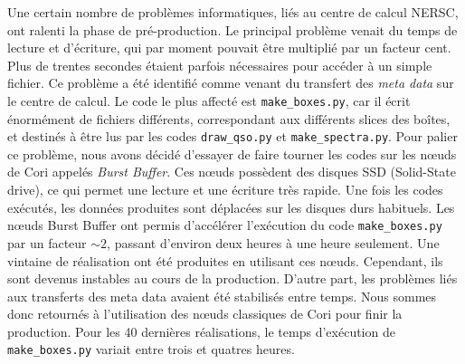 Une certain nombre de problèmes informatiques, liés au centre de calcul NERSC, ont ralenti la phase de pré-production. Le principal problème venait du temps de lecture et d'écriture, qui par moment pouvait être multiplié par un facteur cent. Plus de trentes secondes étaient parfois nécessaires pour accéder à un simple fichier. Ce problème a été identifié comme venant du transfert des \emph{meta data} sur le centre de calcul. Le code le plus affecté est \texttt{make\_boxes.py}, car il écrit énormément de fichiers différents, correspondant aux différents slices des boîtes, et destinés à être lus par les codes \texttt{draw\_qso.py} et \texttt{make\_spectra.py}. Pour palier ce problème, nous avons décidé d'essayer de faire tourner les codes sur les n{\oe}uds de Cori appelés \emph{Burst Buffer}. Ces n{\oe}uds possèdent des disques SSD (Solid-State drive), ce qui permet une lecture et une écriture très rapide. Une fois les codes exécutés, les données produites sont déplacées sur les disques durs habituels. Les n{\oe}uds Burst Buffer ont permis d'accélérer l'exécution du code \texttt{make\_boxes.py} par un facteur $\sim \num{2}$, passant d'environ deux heures à une heure seulement. Une vintaine de réalisation ont été produites en utilisant ces n{\oe}uds. Cependant, ils sont devenus instables au cours de la production. D'autre part, les problèmes liés aux transferts des meta data avaient été stabilisés entre temps. Nous sommes donc retournés à l'utilisation des n{\oe}uds classiques de Cori pour finir la production. Pour les 40 dernières réalisations, le temps d'exécution de \texttt{make\_boxes.py} variait entre trois et quatres heures.

